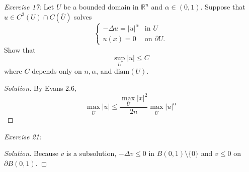 \documentclass{article}
\newcommand{\exercise}[2]{
\vspace{0.2in}\begin{mdframed}[
  backgroundcolor=problem,
  skipabove=\topsep,
  skipbelow=\topsep
  ]
  \emph{Exercise {#1}:} {#2}
\end{mdframed}}
\newcommand{\R}{\mathbb{R}}
\begin{document}
      \exercise{17}{Let $U$ be a bounded domain in $\R^n$ and $\alpha \in (0,1)$. Suppose that $u\in C^2(U)\cap C(\overline{U})$ solves 
      \[\begin{cases}
        -\Delta u = |u|^\alpha &\text{in } U\\
        u(x) = 0 &\text{on } \partial U.
      \end{cases}\]
      Show that 
      \[ \sup_U|u|\le C\]
      where $C$ depends only on $n,\alpha$, and $\text{diam}(U)$.}
      \begin{proof}[Solution]
        By Evans 2.6, 
        \[\max_{\bar{U}} |u| \le \frac{\max_{\overline{U}}|x|^2}{2n}\max_{\overline{U}}|u|^\alpha\]
      \end{proof}
      \exercise{21}{}
      \begin{proof}[Solution]
         Because $v$ is a subsolution, $-\Delta v \le 0$ in $B(0,1)\setminus \{0\}$ and $v\le 0$ on $\partial B(0,1)$. 
      \end{proof}
    
\end{document}
